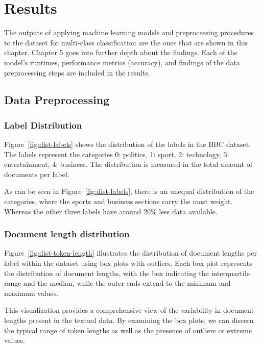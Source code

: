 \chapter{Results}

The outputs of applying machine learning models and preprocessing procedures to the dataset for multi-class classification are the ones that are shown in this chapter. Chapter 5 goes into further depth about the findings. Each of the model’s runtimes, performance metrics (accuracy), and findings of the data preprocessing steps are included in the results. 

\section{Data Preprocessing}
\subsection{Label Distribution}


Figure~\ref{fig:dist-labels} shows the distribution of the labels in the BBC dataset. The labels represent the categories 0: politics, 1: sport, 2: technology, 3: entertainment, 4: business. The distribution is measured in the total amount of documents per label.

As can be seen in Figure~\ref{fig:dist-labels}, there is an unequal distribution of the categories, where the sports and business sections carry the most weight. Whereas the other three labels have around 20\% less data available.

\subsection{Document length distribution}


Figure~\ref{fig:dist-token-length} illustrates the distribution of document lengths per label within the dataset using box plots with outliers. Each box plot represents the distribution of document lengths, with the box indicating the interquartile range and the median, while the outer ends extend to the minimum and maximum values.

This visualization provides a comprehensive view of the variability in document lengths present in the textual data. By examining the box plots, we can discern the typical range of token lengths as well as the presence of outliers or extreme values.

